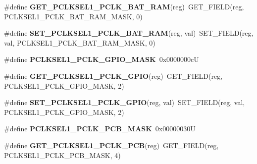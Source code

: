 \begin{DoxyCompactItemize}
\#define {\bfseries G\+E\+T\+\_\+\+P\+C\+L\+K\+S\+E\+L1\+\_\+\+P\+C\+L\+K\+\_\+\+B\+A\+T\+\_\+\+R\+AM}(reg)~G\+E\+T\+\_\+\+F\+I\+E\+LD(reg, P\+C\+L\+K\+S\+E\+L1\+\_\+\+P\+C\+L\+K\+\_\+\+B\+A\+T\+\_\+\+R\+A\+M\+\_\+\+M\+A\+SK, 0)
\item 
\mbox{\label{group__lpc24xx__regs_gaea6ac27ec6d2eb65f5cf48f0edb47b69}} 
\#define {\bfseries S\+E\+T\+\_\+\+P\+C\+L\+K\+S\+E\+L1\+\_\+\+P\+C\+L\+K\+\_\+\+B\+A\+T\+\_\+\+R\+AM}(reg,  val)~S\+E\+T\+\_\+\+F\+I\+E\+LD(reg, val, P\+C\+L\+K\+S\+E\+L1\+\_\+\+P\+C\+L\+K\+\_\+\+B\+A\+T\+\_\+\+R\+A\+M\+\_\+\+M\+A\+SK, 0)
\item 
\mbox{\label{group__lpc24xx__regs_ga5284333ac3ca9c227bc6426b23035645}} 
\#define {\bfseries P\+C\+L\+K\+S\+E\+L1\+\_\+\+P\+C\+L\+K\+\_\+\+G\+P\+I\+O\+\_\+\+M\+A\+SK}~0x0000000cU
\item 
\mbox{\label{group__lpc24xx__regs_ga37946457f3645288c393618c329b7946}} 
\#define {\bfseries G\+E\+T\+\_\+\+P\+C\+L\+K\+S\+E\+L1\+\_\+\+P\+C\+L\+K\+\_\+\+G\+P\+IO}(reg)~G\+E\+T\+\_\+\+F\+I\+E\+LD(reg, P\+C\+L\+K\+S\+E\+L1\+\_\+\+P\+C\+L\+K\+\_\+\+G\+P\+I\+O\+\_\+\+M\+A\+SK, 2)
\item 
\mbox{\label{group__lpc24xx__regs_ga7ca353666cbda657403eec328c54c3fc}} 
\#define {\bfseries S\+E\+T\+\_\+\+P\+C\+L\+K\+S\+E\+L1\+\_\+\+P\+C\+L\+K\+\_\+\+G\+P\+IO}(reg,  val)~S\+E\+T\+\_\+\+F\+I\+E\+LD(reg, val, P\+C\+L\+K\+S\+E\+L1\+\_\+\+P\+C\+L\+K\+\_\+\+G\+P\+I\+O\+\_\+\+M\+A\+SK, 2)
\item 
\mbox{\label{group__lpc24xx__regs_gaca318766e29ba8b866c26dee352b88ec}} 
\#define {\bfseries P\+C\+L\+K\+S\+E\+L1\+\_\+\+P\+C\+L\+K\+\_\+\+P\+C\+B\+\_\+\+M\+A\+SK}~0x00000030U
\item 
\mbox{\label{group__lpc24xx__regs_ga7ecd1569e5cbbe81b82f6a3320948bd1}} 
\#define {\bfseries G\+E\+T\+\_\+\+P\+C\+L\+K\+S\+E\+L1\+\_\+\+P\+C\+L\+K\+\_\+\+P\+CB}(reg)~G\+E\+T\+\_\+\+F\+I\+E\+LD(reg, P\+C\+L\+K\+S\+E\+L1\+\_\+\+P\+C\+L\+K\+\_\+\+P\+C\+B\+\_\+\+M\+A\+SK, 4)
\item 
\mbox{\label{group__lpc24xx__regs_gad641bff9f4eb1a31ee61ae54cb19ff32}} 

\end{DoxyCompactItemize}
